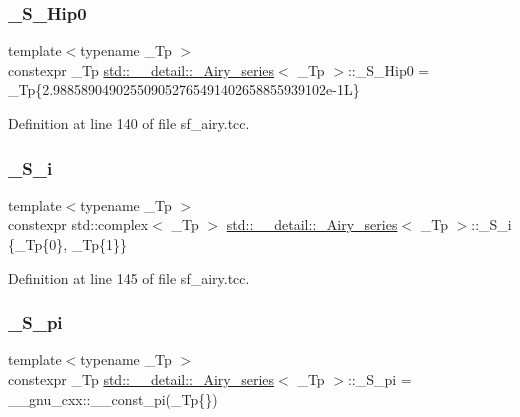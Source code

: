 \subsubsection{\texorpdfstring{\+\_\+\+S\+\_\+\+Hip0}{\_S\_Hip0}}
{\footnotesize\ttfamily template$<$typename \+\_\+\+Tp $>$ \\
constexpr \+\_\+\+Tp \hyperlink{classstd_1_1____detail_1_1__Airy__series}{std\+::\+\_\+\+\_\+detail\+::\+\_\+\+Airy\+\_\+series}$<$ \+\_\+\+Tp $>$\+::\+\_\+\+S\+\_\+\+Hip0 = \+\_\+\+Tp\{2.\+988589049025509052765491402658855939102e-\/1\+L\}\hspace{0.3cm}{\ttfamily [static]}}



Definition at line 140 of file sf\+\_\+airy.\+tcc.

\mbox{\label{classstd_1_1____detail_1_1__Airy__series_a4133b308af0c967a73c918af22c93b09}} 
\subsubsection{\texorpdfstring{\+\_\+\+S\+\_\+i}{\_S\_i}}
{\footnotesize\ttfamily template$<$typename \+\_\+\+Tp $>$ \\
constexpr std\+::complex$<$ \+\_\+\+Tp $>$ \hyperlink{classstd_1_1____detail_1_1__Airy__series}{std\+::\+\_\+\+\_\+detail\+::\+\_\+\+Airy\+\_\+series}$<$ \+\_\+\+Tp $>$\+::\+\_\+\+S\+\_\+i \{\+\_\+\+Tp\{0\}, \+\_\+\+Tp\{1\}\}\hspace{0.3cm}{\ttfamily [static]}}



Definition at line 145 of file sf\+\_\+airy.\+tcc.

\mbox{\label{classstd_1_1____detail_1_1__Airy__series_a9de354dae47d41acc60824681d864184}} 
\subsubsection{\texorpdfstring{\+\_\+\+S\+\_\+pi}{\_S\_pi}}
{\footnotesize\ttfamily template$<$typename \+\_\+\+Tp $>$ \\
constexpr \+\_\+\+Tp \hyperlink{classstd_1_1____detail_1_1__Airy__series}{std\+::\+\_\+\+\_\+detail\+::\+\_\+\+Airy\+\_\+series}$<$ \+\_\+\+Tp $>$\+::\+\_\+\+S\+\_\+pi = \+\_\+\+\_\+gnu\+\_\+cxx\+::\+\_\+\+\_\+const\+\_\+pi(\+\_\+\+Tp\{\})\hspace{0.3cm}{\ttfamily [static]}}




